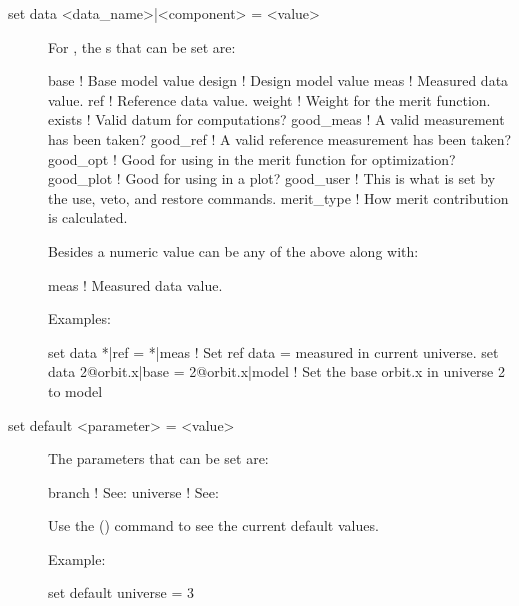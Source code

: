 {{\begin{description}

\item[set data <data\_name>|<component> = <value>] \Newline

\vskip -0.2in

For , the s that can be set are:
\begin{example}
  base        ! Base model value
  design      ! Design model value
  meas        ! Measured data value.
  ref         ! Reference data value.
  weight      ! Weight for the merit function.
  exists      ! Valid datum for computations?
  good_meas   ! A valid measurement has been taken?
  good_ref    ! A valid reference measurement has been taken?
  good_opt    ! Good for using in the merit function for optimization?
  good_plot   ! Good for using in a plot?
  good_user   ! This is what is set by the use, veto, and restore commands.
  merit_type  ! How merit contribution is calculated.
\end{example}
Besides a numeric value  can be any of the above along with:
\begin{example}
  meas        ! Measured data value.
\end{example}

Examples:
\begin{example}
  set data *|ref = *|meas       ! Set ref data = measured in current universe.
  set data 2@orbit.x|base = 2@orbit.x|model 
                                ! Set the base orbit.x in universe 2 to model
\end{example}


\item[set default <parameter> = <value>] \Newline

\vskip -0.2in

The parameters that can be set are:
\begin{example}
  branch            ! See: 
  universe          ! See: 
\end{example}

Use the  () command to see the current
default values.

Example:
\begin{example}
  set default universe = 3
\end{example}



\end{description}}}
